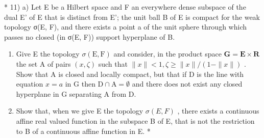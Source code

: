 * 11) a) Let E be a Hilbert space and F an everywhere dense subspace of the dual E' of E that is distinct from E'; the unit ball B of E is compact for the weak topology σ(E, F), and there exists a point a of the unit sphere through which passes no closed (in σ(E, F)) support hyperplane of B.

\begin{enumerate}
\def\labelenumi{\alph{enumi})}
\setcounter{enumi}{1}
\item
  Give E the topology \(\sigma(\mathrm{E},\mathrm{F})\) and consider, in the product space \(\mathbf{G} = \mathbf{E} \times \mathbf{R}\) the set A of pairs \((x,\zeta)\) such that \(\|x\| < 1, \zeta \geqslant \|x\| / (1 - \|x\|)\) . Show that A is closed and locally compact, but that if D is the line with equation \(x = a\) in G then \(\mathrm{D} \cap \mathrm{A} = \emptyset\) and there does not exist any closed hyperplane in G separating A from D.
\item
  Show that, when we give E the topology \(\sigma(E, F)\) , there exists a continuous affine real valued function in the subspace B of E, that is not the restriction to B of a continuous affine function in E. *
\end{enumerate}


